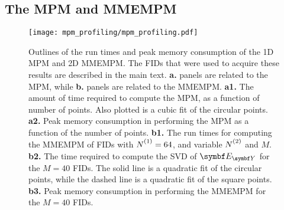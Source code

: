 \subsection{The \acs{MPM} and \acs{MMEMPM}}
\begin{figure}
    \texttt{[image: mpm\_profiling/mpm\_profiling.pdf]}
    \caption[
        Outlines the run times and peak memory consumption of
        the \acs{1D} \acs{MPM} and \acs{2D} \acs{MMEMPM}.
    ]
    {
        Outlines of the run times and peak memory consumption of
        the \acs{1D} \acs{MPM} and \acs{2D} \acs{MMEMPM}.
        The \acp{FID} that were used to acquire these results are described in
        the main text.
        \textbf{a.} panels are related to the \acs{MPM}, while \textbf{b.}
        panels are related to the \acs{MMEMPM}.
        \textbf{a1.} The amount of time required to compute the \ac{MPM}, as a
        function of number of points. Also plotted is a cubic fit of the
        circular points.
        \textbf{a2.} Peak memory consumption in performing the \ac{MPM} as a
        function of the number of points.
        \textbf{b1.} The run times for computing the \ac{MMEMPM} of
        \acp{FID} with $\None = 64$, and variable $\Ntwo$ and $M$.
        \textbf{b2.} The time required to compute the \ac{SVD} of $\EY$ for the
        $M=40$ \acp{FID}. The solid line is a quadratic fit of the circular
        points, while the dashed line is a quadratic fit of the square points.
        \textbf{b3.} Peak memory consumption in performing the \ac{MMEMPM} for
        the $M=40$ \acp{FID}.
    }
    \label{fig:mpm-profiling}
\end{figure}

